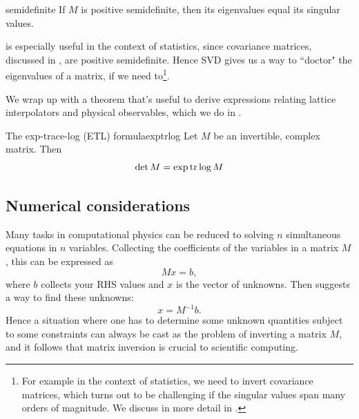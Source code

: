\begin{proposition}{}{semidefinite}
If $M$ is positive semidefinite, then its eigenvalues equal its singular values.
\end{proposition}

 is especially useful in the context of statistics,
since covariance matrices, discussed in , are
positive semidefinite. Hence SVD gives us a way to ``doctor" the eigenvalues
of a matrix, if we need to\footnote{For example in the context of statistics,
we need to invert covariance matrices, which turns out to be challenging if
the singular values span many orders of magnitude. 
We discuss in more detail in .}. 


We wrap up with a theorem that's useful to derive expressions relating
lattice interpolators and physical observables,
which we do in .
\begin{theorem}{The exp-trace-log (ETL) formula}{exptrlog}
  Let $M$ be an invertible, complex matrix. Then
  $$\det M = \exp \tr \log M$$
\end{theorem}


\subsection{Numerical considerations}\label{sec:numerics}


Many tasks in computational physics can be reduced to solving
$n$ simultaneous equations in $n$ variables. Collecting
the coefficients of the variables in a matrix $M$, this
can be expressed as
\begin{equation}\label{eq:solveGeneral}
Mx=b,
\end{equation}
where $b$ collects your RHS values and $x$ is the vector
of unknowns. Then  suggests a way
to find these unknowns:
\begin{equation}
x=M^{-1}b.
\end{equation}
Hence a situation where one has to determine some unknown
quantities subject to some constraints can always be cast
as the problem of inverting a matrix $M$, and it follows that
matrix inversion is crucial to scientific computing.

